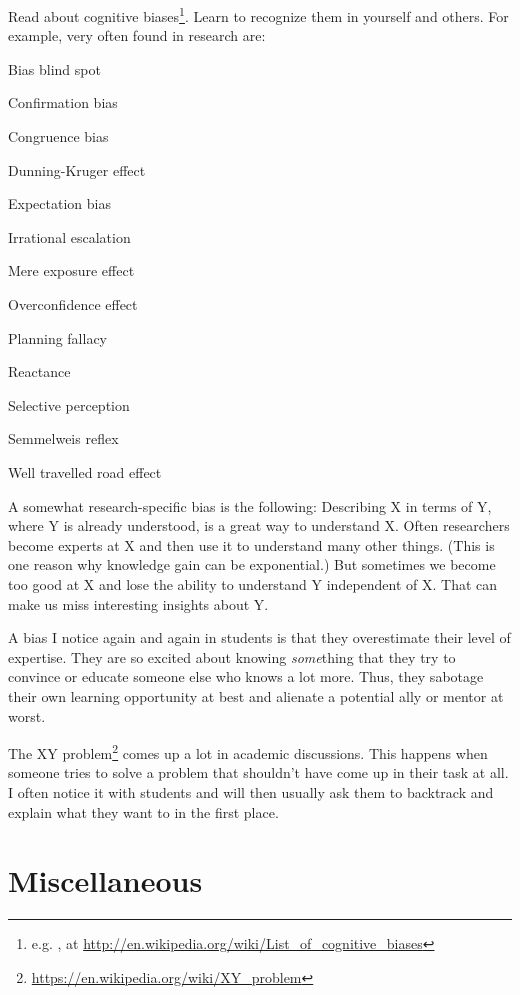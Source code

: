 \documentclass[12pt]{article}
\begin{document}
Read about cognitive biases\footnote{e.g. , at \url{http://en.wikipedia.org/wiki/List_of_cognitive_biases}}.
Learn to recognize them in yourself and others. For example, very often found in research are:
\begin{compactitem}
\item Bias blind spot
\item Confirmation bias
\item Congruence bias
\item Dunning-Kruger effect
\item Expectation bias
\item Irrational escalation
\item Mere exposure effect
\item Overconfidence effect
\item Planning fallacy
\item Reactance
\item Selective perception
\item Semmelweis reflex
\item Well travelled road effect
\end{compactitem}
\medskip

A somewhat research-specific bias is the following:
Describing X in terms of Y, where Y is already understood, is a great way to understand X.
Often researchers become experts at X and then use it to understand many other things. (This is one reason why knowledge gain can be exponential.)
But sometimes we become too good at X and lose the ability to understand Y independent of X.
That can make us miss interesting insights about Y.
\medskip

A bias I notice again and again in students is that they overestimate their level of expertise.
They are so excited about knowing \emph{some}thing that they try to convince or educate someone else who knows a lot more.
Thus, they sabotage their own learning opportunity at best and alienate a potential ally or mentor at worst.
\medskip

The XY problem\footnote{\url{https://en.wikipedia.org/wiki/XY_problem}} comes up a lot in academic discussions.
This happens when someone tries to solve a problem that shouldn't have come up in their task at all.
I often notice it with students and will then usually ask them to backtrack and explain what they want to in the first place.

\section{Miscellaneous}
\end{document}
